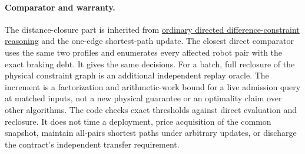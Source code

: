 \documentclass[11pt]{article}
\begin{document}
\paragraph{Comparator and warranty.}
The distance-closure part is inherited from \href{https://cse.unl.edu/~choueiry/Documents/DechterMeiri-AIJ.pdf}{ordinary directed difference-constraint reasoning} and the one-edge shortest-path update. The closest direct comparator uses the same two profiles and enumerates every affected robot pair with the exact braking debt. It gives the same decisions. For a batch, full reclosure of the physical constraint graph is an additional independent replay oracle. The increment is a factorization and arithmetic-work bound for a live admission query at matched inputs, not a new physical guarantee or an optimality claim over other algorithms. The code checks exact thresholds against direct evaluation and reclosure. It does not time a deployment, price acquisition of the common snapshot, maintain all-pairs shortest paths under arbitrary updates, or discharge the contract's independent transfer requirement.
\end{document}
